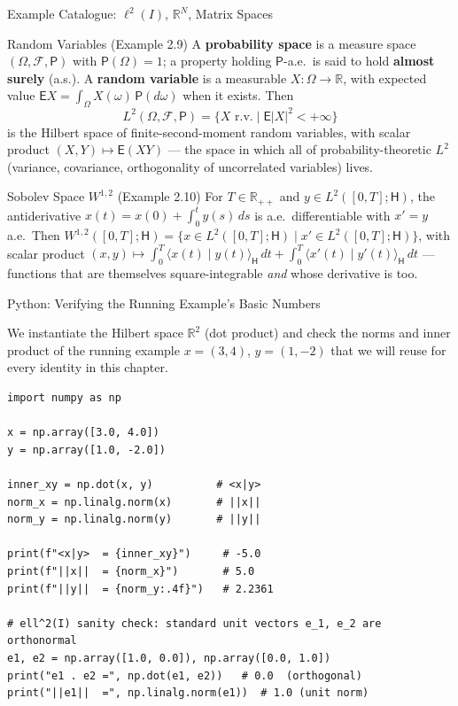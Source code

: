 \documentclass[aspectratio=169,10pt]{beamer}
\newcommand{\R}{\mathbb{R}}
\newcommand{\ip}[2]{\langle #1 \mid #2 \rangle}
\begin{document}
\begin{frame}[allowframebreaks]{Example Catalogue: $\ell^2(I)$, $\R^N$, Matrix Spaces}
  \begin{block}{Random Variables (Example 2.9)}
    A \textbf{probability space} is a measure space $(\Omega,\mathcal F,\mathsf
    P)$ with $\mathsf P(\Omega)=1$; a property holding $\mathsf P$-a.e.\ is
    said to hold \textbf{almost surely} (a.s.). A \textbf{random variable}
    is a measurable $X : \Omega \to \R$, with expected value $\mathsf E X =
    \int_\Omega X(\omega)\,\mathsf P(d\omega)$ when it exists. Then
    \[
      L^2(\Omega,\mathcal F,\mathsf P) = \big\{ X \text{ r.v.} \mid \mathsf
      E|X|^2 < +\infty \big\}
    \]
    is the Hilbert space of finite-second-moment random variables, with
    scalar product $(X,Y) \mapsto \mathsf E(XY)$ --- the space in which all
    of probability-theoretic $L^2$ (variance, covariance, orthogonality of
    uncorrelated variables) lives.
  \end{block}

  \begin{block}{Sobolev Space $W^{1,2}$ (Example 2.10)}
    For $T \in \R_{++}$ and $y \in L^2([0,T];\mathsf H)$, the antiderivative
    $x(t) = x(0) + \int_0^t y(s)\,ds$ is a.e.\ differentiable with $x' = y$
    a.e.\ Then $W^{1,2}([0,T];\mathsf H) = \{ x \in L^2([0,T];\mathsf H) \mid
    x' \in L^2([0,T];\mathsf H)\}$, with scalar product $(x,y) \mapsto
    \int_0^T \ip{x(t)}{y(t)}_{\mathsf H}\,dt + \int_0^T
    \ip{x'(t)}{y'(t)}_{\mathsf H}\,dt$ --- functions that are themselves
    square-integrable \emph{and} whose derivative is too.
  \end{block}

\end{frame}

\begin{frame}[fragile]{Python: Verifying the Running Example's Basic Numbers}

We instantiate the Hilbert space $\R^2$ (dot product) and check the norms
and inner product of the running example $x=(3,4)$, $y=(1,-2)$ that we will
reuse for every identity in this chapter.

\begin{lstlisting}[style=pycode]
import numpy as np

x = np.array([3.0, 4.0])
y = np.array([1.0, -2.0])

inner_xy = np.dot(x, y)          # <x|y>
norm_x = np.linalg.norm(x)       # ||x||
norm_y = np.linalg.norm(y)       # ||y||

print(f"<x|y>  = {inner_xy}")     # -5.0
print(f"||x||  = {norm_x}")       # 5.0
print(f"||y||  = {norm_y:.4f}")   # 2.2361

# ell^2(I) sanity check: standard unit vectors e_1, e_2 are orthonormal
e1, e2 = np.array([1.0, 0.0]), np.array([0.0, 1.0])
print("e1 . e2 =", np.dot(e1, e2))   # 0.0  (orthogonal)
print("||e1||  =", np.linalg.norm(e1))  # 1.0 (unit norm)
\end{lstlisting}

\end{frame}
\end{document}
